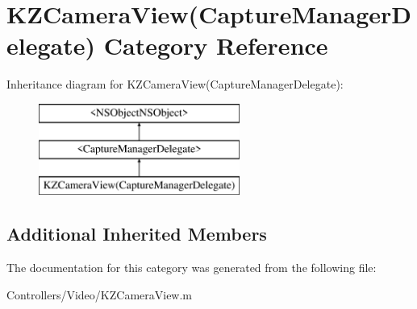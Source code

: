\hypertarget{category_k_z_camera_view_07_capture_manager_delegate_08}{}\section{K\+Z\+Camera\+View(Capture\+Manager\+Delegate) Category Reference}
\label{category_k_z_camera_view_07_capture_manager_delegate_08}
Inheritance diagram for K\+Z\+Camera\+View(Capture\+Manager\+Delegate)\+:\begin{figure}[H]
\begin{center}
\leavevmode
\includegraphics[height=3.000000cm]{category_k_z_camera_view_07_capture_manager_delegate_08}
\end{center}
\end{figure}
\subsection*{Additional Inherited Members}


The documentation for this category was generated from the following file\+:\begin{DoxyCompactItemize}
\item 
Controllers/\+Video/K\+Z\+Camera\+View.\+m\end{DoxyCompactItemize}
